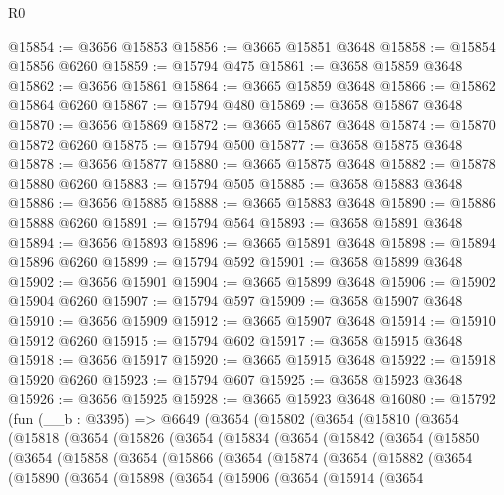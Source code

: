 \begin{lexlean}{R0}
\begin{coremodule}
@15854 := @3656 @15853
@15856 := @3665 @15851 @3648
@15858 := @15854 @15856 @6260
@15859 := @15794 @475
@15861 := @3658 @15859 @3648
@15862 := @3656 @15861
@15864 := @3665 @15859 @3648
@15866 := @15862 @15864 @6260
@15867 := @15794 @480
@15869 := @3658 @15867 @3648
@15870 := @3656 @15869
@15872 := @3665 @15867 @3648
@15874 := @15870 @15872 @6260
@15875 := @15794 @500
@15877 := @3658 @15875 @3648
@15878 := @3656 @15877
@15880 := @3665 @15875 @3648
@15882 := @15878 @15880 @6260
@15883 := @15794 @505
@15885 := @3658 @15883 @3648
@15886 := @3656 @15885
@15888 := @3665 @15883 @3648
@15890 := @15886 @15888 @6260
@15891 := @15794 @564
@15893 := @3658 @15891 @3648
@15894 := @3656 @15893
@15896 := @3665 @15891 @3648
@15898 := @15894 @15896 @6260
@15899 := @15794 @592
@15901 := @3658 @15899 @3648
@15902 := @3656 @15901
@15904 := @3665 @15899 @3648
@15906 := @15902 @15904 @6260
@15907 := @15794 @597
@15909 := @3658 @15907 @3648
@15910 := @3656 @15909
@15912 := @3665 @15907 @3648
@15914 := @15910 @15912 @6260
@15915 := @15794 @602
@15917 := @3658 @15915 @3648
@15918 := @3656 @15917
@15920 := @3665 @15915 @3648
@15922 := @15918 @15920 @6260
@15923 := @15794 @607
@15925 := @3658 @15923 @3648
@15926 := @3656 @15925
@15928 := @3665 @15923 @3648
@16080 := @15792
    (fun (__b : @3395) =>
    @6649
      (@3654
        (@15802
          (@3654
            (@15810
              (@3654
                (@15818
                  (@3654
                    (@15826
                      (@3654
                        (@15834
                          (@3654
                            (@15842
                              (@3654
                                (@15850
                                  (@3654
                                    (@15858
                                      (@3654
                                        (@15866
                                          (@3654
                                            (@15874
                                              (@3654
                                                (@15882
                                                  (@3654
                                                    (@15890
                                                      (@3654
                                                        (@15898
                                                          (@3654
                                                            (@15906
                                                              (@3654
                                                                (@15914
                                                                  (@3654

\end{coremodule}
\end{lexlean}
